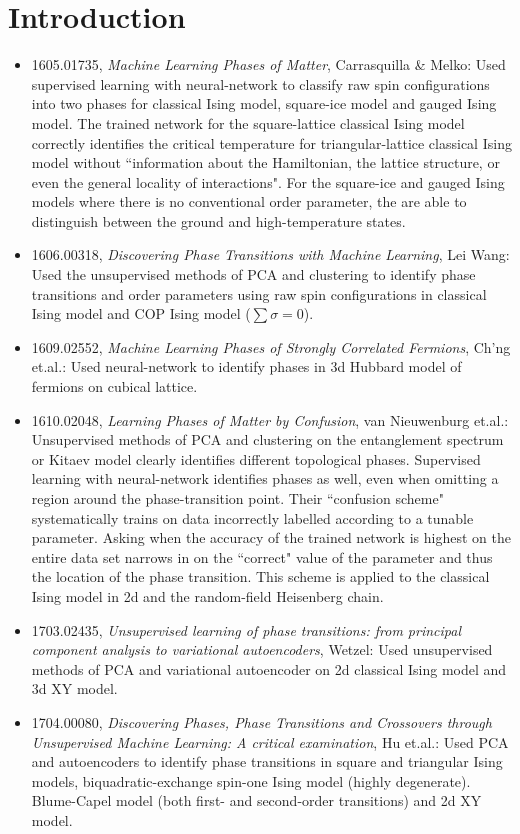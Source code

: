 \documentclass[11pt]{article}
\begin{document}
\section{Introduction}


\begin{itemize}
    \item 1605.01735, \textit{Machine Learning Phases of Matter}, Carrasquilla \& Melko: Used supervised learning with neural-network to classify raw spin configurations into two phases for classical Ising model, square-ice model and gauged Ising model. The trained network for the square-lattice classical Ising model correctly identifies the critical temperature for triangular-lattice classical Ising model without ``information about the Hamiltonian, the lattice structure, or even the general locality of interactions". For the square-ice and gauged Ising models where there is no conventional order parameter, the are able to distinguish between the ground and high-temperature states.
    \item 1606.00318, \textit{Discovering Phase Transitions with Machine Learning}, Lei Wang: Used the unsupervised methods of PCA and clustering to identify phase transitions and order parameters using raw spin configurations in classical Ising model and COP Ising model ($\sum\sigma=0$).
    \item 1609.02552, \textit{Machine Learning Phases of Strongly Correlated Fermions}, Ch'ng et.al.: Used neural-network to identify phases in 3d Hubbard model of fermions on cubical lattice.
    \item 1610.02048, \textit{Learning Phases of Matter by Confusion}, van Nieuwenburg et.al.: Unsupervised methods of PCA and clustering on the entanglement spectrum or Kitaev model clearly identifies different topological phases. Supervised learning with neural-network identifies phases as well, even when omitting a region around the phase-transition point. Their ``confusion scheme" systematically trains on data incorrectly labelled according to a tunable parameter. Asking when the accuracy of the trained network is highest on the entire data set narrows in on the ``correct" value of the parameter and thus the location of the phase transition. This scheme is applied to the classical Ising model in 2d and the random-field Heisenberg chain.
    \item 1703.02435, \textit{Unsupervised learning of phase transitions: from principal component analysis to variational autoencoders}, Wetzel: Used unsupervised methods of PCA and variational autoencoder on 2d classical Ising model and 3d XY model.
    \item 1704.00080, \textit{Discovering Phases, Phase Transitions and Crossovers through Unsupervised Machine Learning: A critical examination}, Hu et.al.: Used PCA and autoencoders to identify phase transitions in square and triangular Ising models, biquadratic-exchange spin-one Ising model (highly degenerate). Blume-Capel model (both first- and second-order transitions) and 2d XY model.
\end{itemize}
\end{document}
